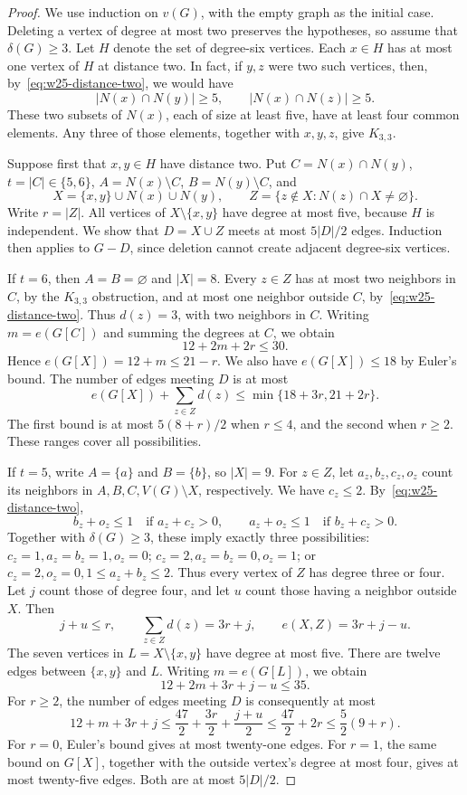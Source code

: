 \documentclass[11pt,a4paper]{article}
\theoremstyle{remark}
\begin{document}
\begin{proof}
We use induction on $v(G)$, with the empty graph as the initial case. Deleting a vertex of degree at most two preserves the hypotheses, so assume that $\delta(G)\ge3$. Let $H$ denote the set of degree-six vertices. Each $x\in H$ has at most one vertex of $H$ at distance two. In fact, if $y,z$ were two such vertices, then, by~\eqref{eq:w25-distance-two}, we would have
\[
|N(x)\cap N(y)|\ge5,\qquad |N(x)\cap N(z)|\ge5.
\]
These two subsets of $N(x)$, each of size at least five, have at least four common elements. Any three of those elements, together with $x,y,z$, give $K_{3,3}$.

Suppose first that $x,y\in H$ have distance two. Put $C=N(x)\cap N(y)$, $t=|C|\in\{5,6\}$, $A=N(x)\setminus C$, $B=N(y)\setminus C$, and
\[
X=\{x,y\}\cup N(x)\cup N(y),\qquad
Z=\{z\notin X:N(z)\cap X\ne\varnothing\}.
\]
Write $r=|Z|$. All vertices of $X\setminus\{x,y\}$ have degree at most five, because $H$ is independent. We show that $D=X\cup Z$ meets at most $5|D|/2$ edges. Induction then applies to $G-D$, since deletion cannot create adjacent degree-six vertices.

If $t=6$, then $A=B=\varnothing$ and $|X|=8$. Every $z\in Z$ has at most two neighbors in $C$, by the $K_{3,3}$ obstruction, and at most one neighbor outside $C$, by~\eqref{eq:w25-distance-two}. Thus $d(z)=3$, with two neighbors in $C$. Writing $m=e(G[C])$ and summing the degrees at $C$, we obtain
\[
12+2m+2r\le30.
\]
Hence $e(G[X])=12+m\le21-r$. We also have $e(G[X])\le18$ by Euler's bound. The number of edges meeting $D$ is at most
\[
e(G[X])+\sum_{z\in Z}d(z)
\le\min\{18+3r,21+2r\}.
\]
The first bound is at most $5(8+r)/2$ when $r\le4$, and the second when $r\ge2$. These ranges cover all possibilities.

If $t=5$, write $A=\{a\}$ and $B=\{b\}$, so $|X|=9$. For $z\in Z$, let $a_z,b_z,c_z,o_z$ count its neighbors in $A,B,C,V(G)\setminus X$, respectively. We have $c_z\le2$. By~\eqref{eq:w25-distance-two},
\[
b_z+o_z\le1\quad\text{if }a_z+c_z>0,
\qquad
a_z+o_z\le1\quad\text{if }b_z+c_z>0.
\]
Together with $\delta(G)\ge3$, these imply exactly three possibilities: $c_z=1,a_z=b_z=1,o_z=0$; $c_z=2,a_z=b_z=0,o_z=1$; or $c_z=2,o_z=0,1\le a_z+b_z\le2$. Thus every vertex of $Z$ has degree three or four. Let $j$ count those of degree four, and let $u$ count those having a neighbor outside $X$. Then
\[
j+u\le r,\qquad
\sum_{z\in Z}d(z)=3r+j,\qquad
e(X,Z)=3r+j-u.
\]
The seven vertices in $L=X\setminus\{x,y\}$ have degree at most five. There are twelve edges between $\{x,y\}$ and $L$. Writing $m=e(G[L])$, we obtain
\[
12+2m+3r+j-u\le35.
\]
For $r\ge2$, the number of edges meeting $D$ is consequently at most
\[
12+m+3r+j
\le\frac{47}{2}+\frac{3r}{2}+\frac{j+u}{2}
\le\frac{47}{2}+2r
\le\frac52(9+r).
\]
For $r=0$, Euler's bound gives at most twenty-one edges. For $r=1$, the same bound on $G[X]$, together with the outside vertex's degree at most four, gives at most twenty-five edges. Both are at most $5|D|/2$.


\end{proof}
\end{document}
